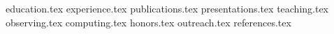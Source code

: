 \documentclass[11pt, a4paper]{awesome-cv}
\newcommand*{\sectiondir}{resume/}
\begin{document}
\makecvheader

{education.tex}
{experience.tex}
\clearpage
{publications.tex}
{presentations.tex}
{teaching.tex}
\clearpage
{observing.tex}
{computing.tex}
{honors.tex}
{outreach.tex}
{references.tex}
\end{document}
